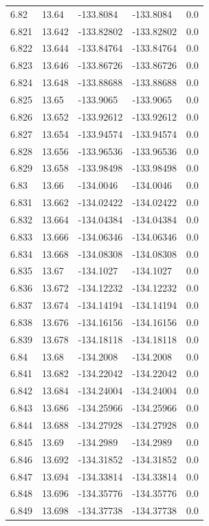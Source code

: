 \begin{tabular}{lllll}
6.82 & 13.64 & -133.8084 & -133.8084 & 0.0 \\
6.821 & 13.642 & -133.82802 & -133.82802 & 0.0 \\
6.822 & 13.644 & -133.84764 & -133.84764 & 0.0 \\
6.823 & 13.646 & -133.86726 & -133.86726 & 0.0 \\
6.824 & 13.648 & -133.88688 & -133.88688 & 0.0 \\
6.825 & 13.65 & -133.9065 & -133.9065 & 0.0 \\
6.826 & 13.652 & -133.92612 & -133.92612 & 0.0 \\
6.827 & 13.654 & -133.94574 & -133.94574 & 0.0 \\
6.828 & 13.656 & -133.96536 & -133.96536 & 0.0 \\
6.829 & 13.658 & -133.98498 & -133.98498 & 0.0 \\
6.83 & 13.66 & -134.0046 & -134.0046 & 0.0 \\
6.831 & 13.662 & -134.02422 & -134.02422 & 0.0 \\
6.832 & 13.664 & -134.04384 & -134.04384 & 0.0 \\
6.833 & 13.666 & -134.06346 & -134.06346 & 0.0 \\
6.834 & 13.668 & -134.08308 & -134.08308 & 0.0 \\
6.835 & 13.67 & -134.1027 & -134.1027 & 0.0 \\
6.836 & 13.672 & -134.12232 & -134.12232 & 0.0 \\
6.837 & 13.674 & -134.14194 & -134.14194 & 0.0 \\
6.838 & 13.676 & -134.16156 & -134.16156 & 0.0 \\
6.839 & 13.678 & -134.18118 & -134.18118 & 0.0 \\
6.84 & 13.68 & -134.2008 & -134.2008 & 0.0 \\
6.841 & 13.682 & -134.22042 & -134.22042 & 0.0 \\
6.842 & 13.684 & -134.24004 & -134.24004 & 0.0 \\
6.843 & 13.686 & -134.25966 & -134.25966 & 0.0 \\
6.844 & 13.688 & -134.27928 & -134.27928 & 0.0 \\
6.845 & 13.69 & -134.2989 & -134.2989 & 0.0 \\
6.846 & 13.692 & -134.31852 & -134.31852 & 0.0 \\
6.847 & 13.694 & -134.33814 & -134.33814 & 0.0 \\
6.848 & 13.696 & -134.35776 & -134.35776 & 0.0 \\
6.849 & 13.698 & -134.37738 & -134.37738 & 0.0 \\

\end{tabular}

